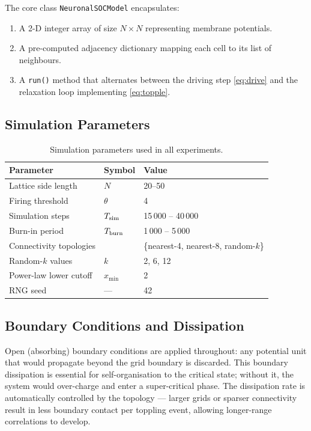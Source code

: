 \documentclass[12pt,a4paper]{article}
\begin{document}
The core class \texttt{NeuronalSOCModel} encapsulates:
\begin{enumerate}[noitemsep]
  \item A 2-D integer array of size $N \times N$ representing membrane
        potentials.
  \item A pre-computed adjacency dictionary mapping each cell to its
        list of neighbours.
  \item A \texttt{run()} method that alternates between the driving step
        \eqref{eq:drive} and the relaxation loop implementing
        \eqref{eq:topple}.
\end{enumerate}

\subsection{Simulation Parameters}

\begin{table}[H]
  \centering
  \caption{Simulation parameters used in all experiments.}
  \label{tab:params}
  \begin{tabular}{lll}
    \toprule
    Parameter & Symbol & Value \\
    \midrule
    Lattice side length & $N$ & 20--50 \\
    Firing threshold & $\theta$ & 4 \\
    Simulation steps & $T_{\rm sim}$ & 15\,000 -- 40\,000 \\
    Burn-in period & $T_{\rm burn}$ & 1\,000 -- 5\,000 \\
    Connectivity topologies & & \{nearest-4, nearest-8, random-$k$\} \\
    Random-$k$ values & $k$ & 2, 6, 12 \\
    Power-law lower cutoff & $x_{\min}$ & 2 \\
    RNG seed & --- & 42 \\
    \bottomrule
  \end{tabular}
\end{table}

\subsection{Boundary Conditions and Dissipation}

Open (absorbing) boundary conditions are applied throughout: any
potential unit that would propagate beyond the grid boundary is
discarded.  This boundary dissipation is essential for
self-organisation to the critical state; without it, the system would
over-charge and enter a super-critical phase.  The dissipation rate is
automatically controlled by the topology — larger grids or sparser
connectivity result in less boundary contact per toppling event,
allowing longer-range correlations to develop.
\end{document}
